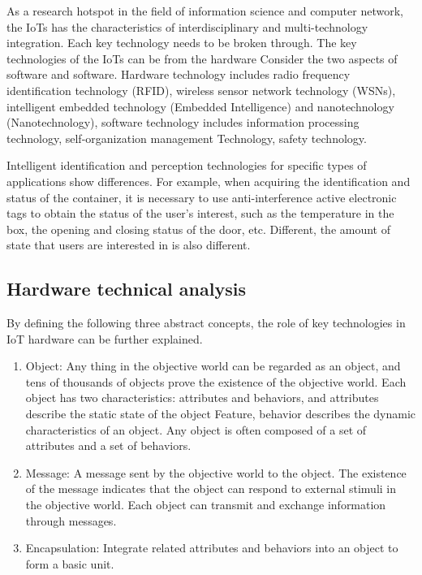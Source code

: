 \documentclass[a4paper,11pt]{article}
\begin{document}
As a research hotspot in the field of information science and computer network, the IoTs has the characteristics of interdisciplinary and multi-technology integration. Each key technology needs to be broken through\cite{6}. The key technologies of the IoTs can be from the hardware Consider the two aspects of software and software. Hardware technology includes radio frequency identification technology (RFID), wireless sensor network technology (WSNs), intelligent embedded technology (Embedded Intelligence) and nanotechnology (Nanotechnology), software technology includes information processing technology, self-organization management Technology, safety technology.

Intelligent identification and perception technologies for specific types of applications show differences. For example, when acquiring the identification and status of the container, it is necessary to use anti-interference active electronic tags to obtain the status of the user's interest, such as the temperature in the box, the opening and closing status of the door, etc. Different, the amount of state that users are interested in is also different.
\subsection{Hardware technical analysis}
By defining the following three abstract concepts, the role of key technologies in IoT hardware can be further explained.
\begin{enumerate}
    \item Object: Any thing in the objective world can be regarded as an object, and tens of thousands of objects prove the existence of the objective world. Each object has two characteristics: attributes and behaviors, and attributes describe the static state of the object Feature, behavior describes the dynamic characteristics of an object. Any object is often composed of a set of attributes and a set of behaviors.
    \item Message: A message sent by the objective world to the object. The existence of the message indicates that the object can respond to external stimuli in the objective world. Each object can transmit and exchange information through messages.
    \item Encapsulation: Integrate related attributes and behaviors into an object to form a basic unit.
\end{enumerate}
\end{document}
